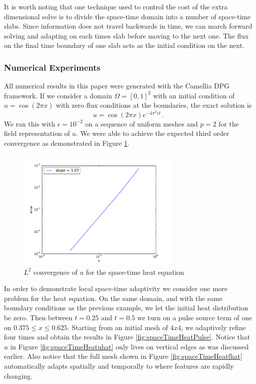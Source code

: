 \documentclass[preprint,12pt]{elsarticle}
\begin{document}
It is worth noting that one technique used to control the cost of the extra dimensional solve is to divide the space-time domain into 
a number of space-time slabs. Since information does not travel backwards in time, 
we can march forward solving and adapting on each times slab before moving to the next one. 
The flux on the final time boundary of one slab acts as the initial condition on the next.

\subsubsection{Numerical Experiments}
All numerical results in this paper were generated with the Camellia DPG framework\cite{CamelliaDPG}.
If we consider a domain $\Omega=[0,1]^2$ with an initial condition of $u=\cos(2\pi x)$ with zero flux conditions at the boundaries,
the exact solution is
\begin{equation*}
	u=\cos(2\pi x)e^{-4\pi^2\epsilon t}\,.
\end{equation*}
We ran this with $\epsilon=10^{-2}$ on a sequence of uniform meshes and $p=2$ for the field representation of $u$. 
We were able to achieve the expected third order convergence as demonstrated in Figure \ref{fig:spaceTimeHeatConvergence}.

\begin{figure}[!ht]
	\centering
	\includegraphics[width=0.7\textwidth]{SpaceTimeHeat/convergence}
	\caption{$L^2$ convergence of $u$ for the space-time heat equation}
	\label{fig:spaceTimeHeatConvergence}
\end{figure}

In order to demonstrate local space-time adaptivity we consider one more problem for the heat equation. 
On the same domain, and with the same boundary conditions as the previous example, we let the initial heat distribution be zero.
Then between $t=0.25$ and $t=0.5$ we turn on a pulse source term of one on $0.375\leq x\leq 0.625$. 
Starting from an initial mesh of $4x4$, we adaptively refine four times and obtain the results in Figure \ref{fig:spaceTimeHeatPulse}.
Notice that $\hat u$ in Figure \ref{fig:spaceTimeHeatuhat} only lives on vertical edges as was discussed earlier.
Also notice that the full mesh shown in Figure \ref{fig:spaceTimeHeatfhat} automatically adapts spatially and temporally to where features are rapidly changing. 
\end{document}
